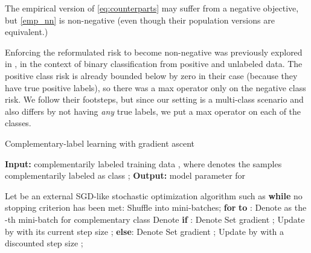 \documentclass{article}
\begin{document}
The empirical version of \eqref{eq:counterparts} may suffer from a negative objective, but \eqref{emp_nn} is non-negative (even though their population versions are equivalent.)

Enforcing the reformulated risk to become non-negative was previously explored in \citet{kiryo17nips}, in the context of binary classification from positive and unlabeled data.  The positive class risk is already bounded below by zero in their case (because they have true positive labels), so there was a max operator only on the negative class risk.  We follow their footsteps, but since our setting is a multi-class scenario and also differs by not having \emph{any} true labels, we put a max operator on each of the  classes.
\begin{algorithm}[t]
  \caption{Complementary-label learning with gradient ascent}
  \label{alg:ascent}
  \begin{algorithmic}
    \STATE \textbf{Input:} complementarily labeled training data , where  denotes the samples complementarily labeled as class ;
    \STATE \textbf{Output:} model parameter  for 
  \end{algorithmic}
  \begin{algorithmic}[1]
    \STATE Let  be an external SGD-like stochastic optimization algorithm such as \citet{kingma15iclr}
    \STATE \textbf{while} no stopping criterion has been met:
    \STATE \quad Shuffle  into  mini-batches;
    \STATE \quad \textbf{for}  \textbf{to} :
    \STATE \qquad Denote  as the -th mini-batch for complementary class 
    \STATE \qquad Denote 
    \STATE \qquad \textbf{if} :
    \STATE \qquad\quad Denote 
    \STATE \qquad\quad Set gradient ;
    \STATE \qquad\quad Update  by  with its current step size ;
    \STATE \qquad \textbf{else}:
    \STATE \qquad\quad Denote 
    \STATE \qquad\quad Set gradient ;
    \STATE \qquad\quad Update  by  with a discounted step size ;
  \end{algorithmic}
\end{algorithm}
\end{document}
